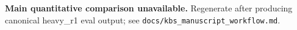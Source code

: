 \begin{table}[t]
\centering
\caption{\textbf{Main quantitative comparison unavailable.} Regenerate after producing canonical heavy\_r1 eval output; see \texttt{docs/kbs\_manuscript\_workflow.md}.}
\label{tab:main-comparison-unavailable}

\end{table}
